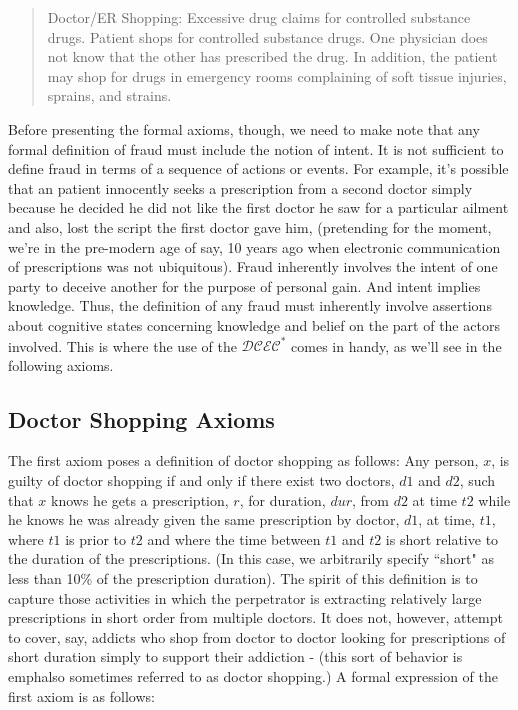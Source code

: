 \blockquote{Doctor/ER Shopping: 
Excessive drug claims for controlled substance drugs. Patient shops for controlled 
substance drugs. One physician does not know that the other has prescribed the drug. In 
addition, the patient may shop for drugs in emergency rooms complaining of soft tissue 
injuries, sprains, and strains.\cite{acfe_manual_2011_doctorshopping}}


Before presenting the formal axioms, though, we need to make note that any formal definition of fraud must include the notion of intent.  It is not sufficient to define fraud in terms of a sequence of actions or events.  For example, it's possible that an patient innocently seeks a prescription from a second doctor simply because he decided he did not like the first doctor he saw for a particular ailment and also, lost the script the first doctor gave him, (pretending for the moment, we're in the pre-modern age of say, 10 years ago when electronic communication of prescriptions was not ubiquitous).  Fraud inherently involves the intent of one party to deceive another for the purpose of personal gain.  And intent implies knowledge.  Thus, the definition of any fraud must inherently involve assertions about cognitive states concerning knowledge and belief on the part of the actors involved.  This is where the use of the $\mathcal{DCEC}^\ast$ comes in handy, as we'll see in the following axioms.

\subsection{Doctor Shopping Axioms}

The first axiom poses a definition of doctor shopping as follows:  Any person, $x$, is guilty of doctor shopping if and only if there exist two doctors, $d1$ and $d2$, such that $x$ knows he gets a prescription, $r$, for duration, $dur$, from $d2$ at time $t2$ while he knows he was already given the same prescription by doctor, $d1$, at time, $t1$, where $t1$ is prior to $t2$ and where the time between $t1$ and $t2$ is short relative to the duration of the prescriptions.  (In this case, we arbitrarily specify ``short" as less than 10\% of the prescription duration).  The spirit of this definition is to capture those activities in which the perpetrator is extracting relatively large prescriptions in short order from multiple doctors.  It does not, however, attempt to cover, say, addicts who shop from doctor to doctor looking for prescriptions of short duration simply to support their addiction - (this sort of behavior is emph{also} sometimes referred to as doctor shopping.)  A formal expression of the first axiom is as follows:

